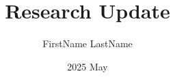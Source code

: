 \documentclass[letterpaper,12pt]{article}
\title{\bfseries Research Update}
\author{FirstName LastName}
\date{2025 May}
\begin{document}
\maketitle
\begin{sloppypar}   %




\newpage
% 


\end{sloppypar}
\end{document}
